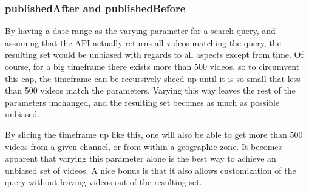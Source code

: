 \subsubsection{publishedAfter and publishedBefore}
By having a date range as the varying parameter for a search query, and assuming
that the API actually returns all videos matching the query, the resulting set
would be unbiased with regards to all aspects except from time. Of course, for
a big timeframe there exists more than 500 videos, so to circumvent this cap,
the timeframe can be recursively sliced up until it is so small that less than
500 videos match the parameters. Varying this way leaves the rest of the
parameters unchanged, and the resulting set becomes as much as possible
unbiased.

By slicing the timeframe up like this, one will also be able to get more than
500 videos from a given channel, or from within a geographic zone. It becomes
apparent that varying this parameter alone is the best way to achieve an unbiased
set of videos. A nice bonus is that it also allows customization of the query
without leaving videos out of the resulting set.

